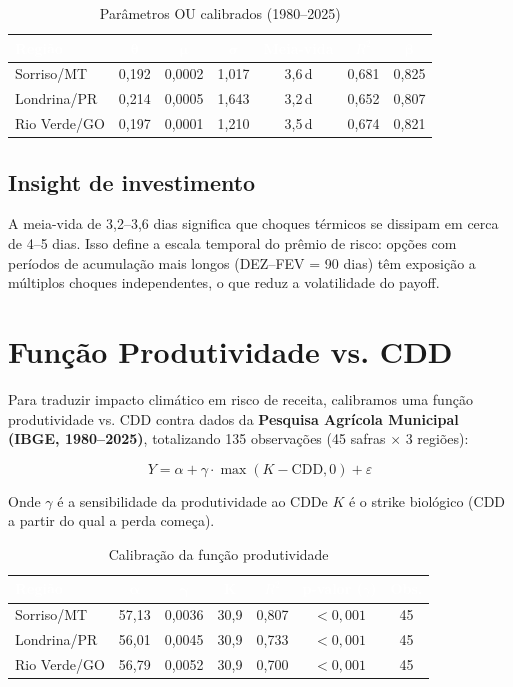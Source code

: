 \documentclass[11pt,a4paper]{article}
\newcommand{\destaque}[1]{\textcolor{wolf_blue}{\textbf{#1}}}
\begin{document}
\begin{table}[htbp]
\centering
\caption{Parâmetros OU calibrados (1980--2025)}
\label{tab:ou}
\small
\begin{tabular}{lcccccc}
\toprule
\rowcolor{wolf_blue}\textcolor{white}{\textbf{Região}} &
\textcolor{white}{$\bm{\theta}$} &
\textcolor{white}{$\bm{\mu}$} &
\textcolor{white}{$\bm{\sigma}$} &
\textcolor{white}{\textbf{Meia-vida}} &
\textcolor{white}{$R^2$} &
\textcolor{white}{$\bm{\beta}$} \\
\midrule
Sorriso/MT   & 0,192 & 0,0002 & 1,017 & 3,6\,d & 0,681 & 0,825 \\
Londrina/PR  & 0,214 & 0,0005 & 1,643 & 3,2\,d & 0,652 & 0,807 \\
Rio Verde/GO & 0,197 & 0,0001 & 1,210 & 3,5\,d & 0,674 & 0,821 \\
\bottomrule
\end{tabular}
\end{table}

\subsection*{Insight de investimento}
A meia-vida de 3,2--3,6 dias significa que choques térmicos se dissipam em
cerca de 4--5 dias. Isso define a escala temporal do prêmio de risco: opções
com períodos de acumulação mais longos (DEZ--FEV = 90 dias) têm exposição
a múltiplos choques independentes, o que reduz a volatilidade do payoff.


\section{Função Produtividade vs. CDD}

Para traduzir impacto climático em risco de receita, calibramos uma função
produtividade vs. CDD contra dados da \destaque{Pesquisa Agrícola Municipal
(IBGE, 1980--2025)}, totalizando 135 observações (45 safras $\times$ 3 regiões):

\[
Y = \alpha + \gamma \cdot \max(K - \text{CDD}, 0) + \varepsilon
\]

Onde $\gamma$ é a sensibilidade da produtividade ao CDD\@ e $K$ é o strike
biológico (CDD a partir do qual a perda começa).

\begin{table}[htbp]
\centering
\caption{Calibração da função produtividade}
\label{tab:prod}
\small
\begin{tabular}{lcccccc}
\toprule
\rowcolor{wolf_blue}\textcolor{white}{\textbf{Região}} &
\textcolor{white}{$\bm{\alpha}$} &
\textcolor{white}{$\bm{\gamma}$} &
\textcolor{white}{$\bm{K}$} &
\textcolor{white}{$R^2$} &
\textcolor{white}{\textbf{p-valor ($\gamma$)}} &
\textcolor{white}{\textbf{Obs.}} \\
\midrule
Sorriso/MT   & 57,13 & 0,0036 & 30,9 & 0,807 & $<0,001$ & 45 \\
Londrina/PR  & 56,01 & 0,0045 & 30,9 & 0,733 & $<0,001$ & 45 \\
Rio Verde/GO & 56,79 & 0,0052 & 30,9 & 0,700 & $<0,001$ & 45 \\
\bottomrule
\end{tabular}
\end{table}
\end{document}
